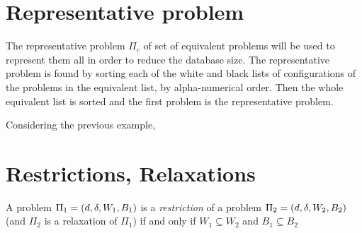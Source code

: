 \section{Representative problem}
The representative problem $\Pi_c$ of set of equivalent problems will be used to represent them all in order to reduce the database size. The representative problem is found by sorting each of the white and black lists of configurations of the problems in the equivalent list, by alpha-numerical order. Then the whole equivalent list is sorted and the first problem is the representative problem.
\begin{exmp}
Considering the previous example,
\end{exmp}
\section{Restrictions, Relaxations}
A problem $\Pi_1 = (d,\delta,W_1,B_1)$ is a \textit{restriction} of a problem $\Pi_2 = (d,\delta,W_2,B_2)$ (and $\Pi_2$ is a relaxation of $\Pi_1$) if and only if $W_1\subseteq W_2$ and $B_1\subseteq B_2$